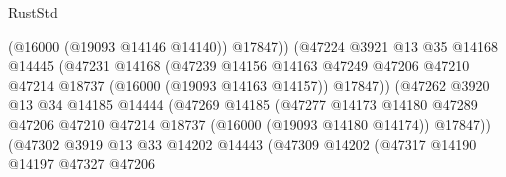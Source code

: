 \begin{lexlean}{RustStd}
\begin{coremodule}
                                          (@16000 (@19093 @14146 @14140))
                                          @17847))
                                      (@47224
                                        @3921
                                        @13
                                        @35
                                        @14168
                                        @14445
                                        (@47231
                                          @14168
                                          (@47239
                                            @14156
                                            @14163
                                            @47249
                                            @47206
                                            @47210
                                            @47214
                                            @18737
                                            (@16000 (@19093 @14163 @14157))
                                            @17847))
                                        (@47262
                                          @3920
                                          @13
                                          @34
                                          @14185
                                          @14444
                                          (@47269
                                            @14185
                                            (@47277
                                              @14173
                                              @14180
                                              @47289
                                              @47206
                                              @47210
                                              @47214
                                              @18737
                                              (@16000 (@19093 @14180 @14174))
                                              @17847))
                                          (@47302
                                            @3919
                                            @13
                                            @33
                                            @14202
                                            @14443
                                            (@47309
                                              @14202
                                              (@47317
                                                @14190
                                                @14197
                                                @47327
                                                @47206

\end{coremodule}
\end{lexlean}

